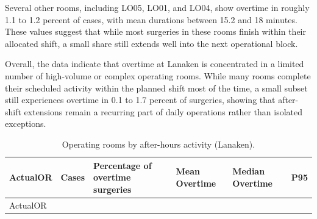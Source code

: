\documentclass[
]{article}
\begin{document}
Several other rooms, including LO05, LO01, and LO04, show overtime in
roughly 1.1 to 1.2 percent of cases, with mean durations between 15.2
and 18 minutes. These values suggest that while most surgeries in these
rooms finish within their allocated shift, a small share still extends
well into the next operational block.

Overall, the data indicate that overtime at Lanaken is concentrated in a
limited number of high-volume or complex operating rooms. While many
rooms complete their scheduled activity within the planned shift most of
the time, a small subset still experiences overtime in 0.1 to 1.7
percent of surgeries, showing that after-shift extensions remain a
recurring part of daily operations rather than isolated exceptions.

\begin{longtable}[]{@{}
  >{\centering\arraybackslash}p{}
  >{\centering\arraybackslash}p{}
  >{\centering\arraybackslash}p{}
  >{\centering\arraybackslash}p{}
  >{\centering\arraybackslash}p{}
  >{\centering\arraybackslash}p{}@{}}
\caption{Operating rooms by after-hours activity (Lanaken).
\label{tab:overtime_or}}\tabularnewline
\toprule\noalign{}
\begin{minipage}[b]{\linewidth}\centering
ActualOR
\end{minipage} & \begin{minipage}[b]{\linewidth}\centering
Cases
\end{minipage} & \begin{minipage}[b]{\linewidth}\centering
Percentage of overtime surgeries
\end{minipage} & \begin{minipage}[b]{\linewidth}\centering
Mean Overtime
\end{minipage} & \begin{minipage}[b]{\linewidth}\centering
Median Overtime
\end{minipage} & \begin{minipage}[b]{\linewidth}\centering
P95
\end{minipage} \\
\midrule\noalign{}
\endfirsthead
\toprule\noalign{}
\begin{minipage}[b]{\linewidth}\centering
ActualOR
\end{minipage} & \begin{minipage}[b]{\linewidth}\centering

\end{minipage}
\end{longtable}
\end{document}
